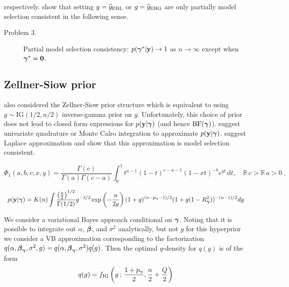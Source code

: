 \documentclass{article}[12pt]
\def\bR{{\mathbb R}}
\begin{document}
\noindent respectively. \cite{Liang2008} show that setting
$g = \widehat{g}_{\mbox{\scriptsize EBL}}$ or 
$g = \widehat{g}_{\mbox{\scriptsize EBG}}$
are only partially model selection consistent in the following sense.
\begin{description}
	\item[Problem 3.] Partial model selection consistency: $p({\boldsymbol \gamma}^*|{\bf y}) \to 1$ as $n\to\infty$ except
	when ${\boldsymbol \gamma}^* = {\bf 0}$.
\end{description}

\newpage 


\subsection{Zellner-Siow prior}


\cite{Liang2008} also considered
the Zellner-Siow prior structure \citep{Zellner1980} which is
equivalent to using $g\sim \mbox{IG}(1/2,n/2)$ inverse-gamma prior on $g$. 
Unfortunately, this choice of prior does not
lead to closed form expressions for $p({\bf y}|{\boldsymbol \gamma})$ (and hence $\mbox{BF}({\boldsymbol \gamma})$).
\cite{Bayarri2007}
suggest univariate quadrature or Monte Calro integration to approximate $p({\bf y}|{\boldsymbol \gamma})$. \cite{Liang2008} suggest Laplace approximation and show that
this approximation is model selection consistent. 

$$
\Phi_1(a,b,c;x,y) = \frac{\Gamma(c)} {\Gamma(a) \Gamma(c-a)} 
\int_0^1 t^{a-1} (1-t)^{c-a-1} (1-xt)^{-b} e^{yt} \,\mathrm{d}t, 
\quad \bR \,c > \bR \,a > 0 ~.
$$


$$
\begin{array}{rl}
\ds p(\vy|\vgamma)
\ds = K(n) \int \frac{\left(\tfrac{n}{2}\right)^{1/2}}{\Gamma(1/2)}
g^{-3/2}\exp\left( -\frac{n}{2g} \right)
(1 + g)^{(n - p_\vgamma - 1)/2}(1 + g (1 - R_\vgamma^2))^{-(n-1)/2}
dg
\\

\end{array} 
$$

We consider a variational Bayes approach conditional on ${\boldsymbol \gamma}$. Noting that it is possible
to integrate out $\alpha$, ${\boldsymbol \beta}$, and $\sigma^2$ analytically, but not $g$ for this hyperprior
we consider a VB approximation corresponding to the factorization
$q(\alpha,{\boldsymbol \beta}_{\boldsymbol \gamma},\sigma^2,g) = q(\alpha,{\boldsymbol \beta}_{\boldsymbol \gamma},\sigma^2)q(g)$.
Then the optimal $q$-density for $q(g)$ is of the form
$$
\displaystyle q(g) 
= f_{\mbox{\scriptsize IG}}\left(  g \,;\, \frac{1+p_{\boldsymbol \gamma}}{2}, \frac{n}{2} + \frac{Q}{2}  \right)
$$
\end{document}
